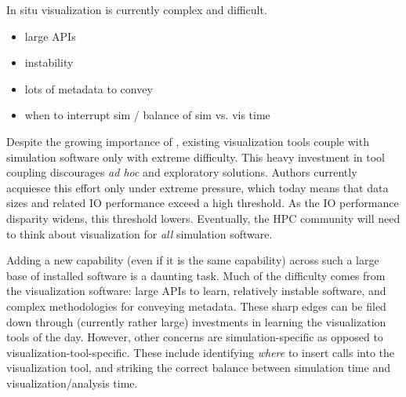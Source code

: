 In situ visualization is currently complex and difficult.
\begin{itemize}
	\item large APIs
	\item instability
	\item lots of metadata to convey
	\item when to interrupt sim / balance of sim vs. vis time
\end{itemize}

Despite the growing importance of \insitu{}, existing visualization
tools couple with simulation software only with extreme difficulty.
This heavy
investment in tool coupling discourages \textit{ad hoc} and exploratory
solutions.  Authors currently acquiesce this effort only under extreme
pressure, which today means that data sizes and related IO performance
exceed a high threshold.  As the IO performance disparity widens, this
threshold lowers.  Eventually, the HPC community will need to think
about
\insitu{} visualization for \emph{all} simulation software.

Adding a new capability (even if it is the same capability) across such
a large base of installed software is a daunting task.  Much of the
difficulty comes from the visualization software: large APIs to learn,
relatively instable software, and complex methodologies for conveying
metadata.  These sharp edges can be filed down through (currently
rather large) investments in learning the visualization tools of the
day.  However, other concerns are simulation-specific as opposed to
visualization-tool-specific.  These include identifying \emph{where}
to insert calls into the visualization tool, and striking the correct
balance between simulation time and visualization/analysis time.



